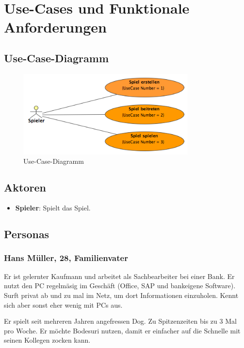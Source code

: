 \documentclass[12pt,halfparskip]{scrartcl}
\begin{document}


\section{Use-Cases und Funktionale Anforderungen} 
\subsection{Use-Case-Diagramm}\label{sub:use_case_diagramm} 
\begin{figure}
	[htp] \centering 
	\includegraphics[width=0.8\textwidth]{UseCaseDiagramm.png} \caption{Use-Case-Diagramm}\label{fig:UseCaseDiagramm.png} 
\end{figure}

\subsection{Aktoren}\label{sec:aktoren} 
\begin{itemize}
	\item \textbf{Spieler}: Spielt das Spiel. 
\end{itemize}

\subsection{Personas}\label{sec:personas} 

\subsubsection{Hans Müller, 28, Familienvater}\label{sub:hans_müller} 

Er ist gelernter Kaufmann und arbeitet als Sachbearbeiter bei einer Bank. Er nutzt den PC regelmäsig im Geschäft (Office, SAP und bankeigene Software). Surft privat ab und zu mal im Netz, um dort Informationen einzuholen. Kennt sich aber sonst eher wenig mit PCs aus. 

Er spielt seit mehreren Jahren angefressen Dog. Zu Spitzenzeiten bis zu 3 Mal pro Woche. Er möchte Bodesuri nutzen, damit er einfacher auf die Schnelle mit seinen Kollegen zocken kann. 
\end{document}

